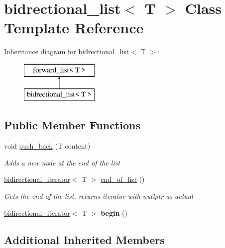 \hypertarget{classbidrectional__list}{}\section{bidrectional\+\_\+list$<$ T $>$ Class Template Reference}
\label{classbidrectional__list}
Inheritance diagram for bidrectional\+\_\+list$<$ T $>$\+:\begin{figure}[H]
\begin{center}
\leavevmode
\includegraphics[height=2.000000cm]{classbidrectional__list}
\end{center}
\end{figure}
\subsection*{Public Member Functions}
\begin{DoxyCompactItemize}
\item 
void \mbox{\hyperlink{classbidrectional__list_a3d403e16b536de9420bf09061b9b374a}{push\+\_\+back}} (T content)
\begin{DoxyCompactList}\small\item\em Adds a new node at the end of the list \end{DoxyCompactList}\item 
\mbox{\hyperlink{classbidirectional__iterator}{bidirectional\+\_\+iterator}}$<$ T $>$ \mbox{\hyperlink{classbidrectional__list_a2e5bed9d79901f40af72f09b8ba30e69}{end\+\_\+of\+\_\+list}} ()
\begin{DoxyCompactList}\small\item\em Gets the end of the list, returns iterator with nullptr as actual \end{DoxyCompactList}\item 
\mbox{\label{classbidrectional__list_a99b98b832b9060c7b23f34c90a1f764a}} 
\mbox{\hyperlink{classbidirectional__iterator}{bidirectional\+\_\+iterator}}$<$ T $>$ {\bfseries begin} ()
\end{DoxyCompactItemize}
\subsection*{Additional Inherited Members}


